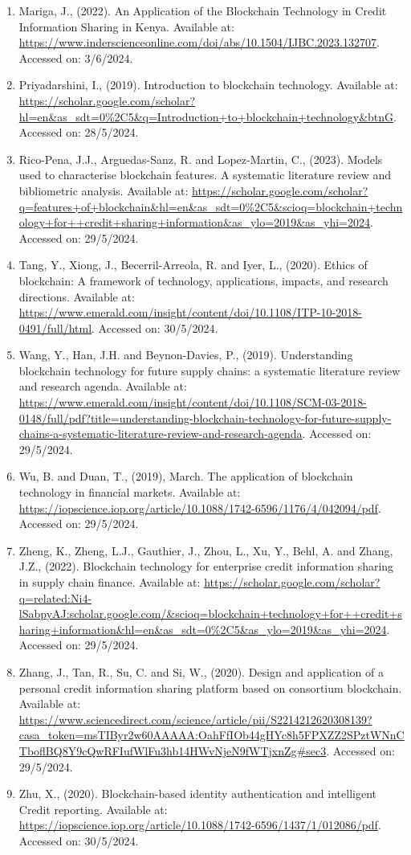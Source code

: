 \documentclass[a4paper]{article}
\begin{document}
\begin{enumerate}
    \item Mariga, J., (2022). An Application of the Blockchain Technology in Credit Information Sharing in Kenya. Available at: \url{https://www.inderscienceonline.com/doi/abs/10.1504/IJBC.2023.132707}. Accessed on: 3/6/2024.
    \item Priyadarshini, I., (2019). Introduction to blockchain technology. Available at: \url{https://scholar.google.com/scholar?hl=en&as_sdt=0\%2C5&q=Introduction+to+blockchain+technology&btnG}. Accessed on: 28/5/2024.
    \item Rico-Pena, J.J., Arguedas-Sanz, R. and Lopez-Martin, C., (2023). Models used to characterise blockchain features. A systematic literature review and bibliometric analysis. Available at: \url{https://scholar.google.com/scholar?q=features+of+blockchain&hl=en&as_sdt=0\%2C5&scioq=blockchain+technology+for++credit+sharing+information&as_ylo=2019&as_yhi=2024}. Accessed on: 29/5/2024.
    \item Tang, Y., Xiong, J., Becerril-Arreola, R. and Iyer, L., (2020). Ethics of blockchain: A framework of technology, applications, impacts, and research directions. Available at: \url{https://www.emerald.com/insight/content/doi/10.1108/ITP-10-2018-0491/full/html}. Accessed on: 30/5/2024.
    \item Wang, Y., Han, J.H. and Beynon-Davies, P., (2019). Understanding blockchain technology for future supply chains: a systematic literature review and research agenda. Available at: \url{https://www.emerald.com/insight/content/doi/10.1108/SCM-03-2018-0148/full/pdf?title=understanding-blockchain-technology-for-future-supply-chains-a-systematic-literature-review-and-research-agenda}. Accessed on: 29/5/2024.
    \item Wu, B. and Duan, T., (2019), March. The application of blockchain technology in financial markets. Available at: \url{https://iopscience.iop.org/article/10.1088/1742-6596/1176/4/042094/pdf}. Accessed on: 29/5/2024.
    \item Zheng, K., Zheng, L.J., Gauthier, J., Zhou, L., Xu, Y., Behl, A. and Zhang, J.Z., (2022). Blockchain technology for enterprise credit information sharing in supply chain finance. Available at: \url{https://scholar.google.com/scholar?q=related:Ni4-lSabpyAJ:scholar.google.com/&scioq=blockchain+technology+for++credit+sharing+information&hl=en&as_sdt=0\%2C5&as_ylo=2019&as_yhi=2024}. Accessed on: 29/5/2024.
    \item Zhang, J., Tan, R., Su, C. and Si, W., (2020). Design and application of a personal credit information sharing platform based on consortium blockchain. Available at: \url{https://www.sciencedirect.com/science/article/pii/S2214212620308139?casa_token=msTIByr2w60AAAAA:OahFfIOb44gHYc8h5FPXZZ2SPztWNnCTboflBQ8Y9cQwRFIufWlFu3hb14HWvNjeN9fWTjxnZg#sec3}. Accessed on: 29/5/2024.
    \item Zhu, X., (2020). Blockchain-based identity authentication and intelligent Credit reporting. Available at: \url{https://iopscience.iop.org/article/10.1088/1742-6596/1437/1/012086/pdf}. Accessed on: 30/5/2024.
\end{enumerate}
\end{document}
